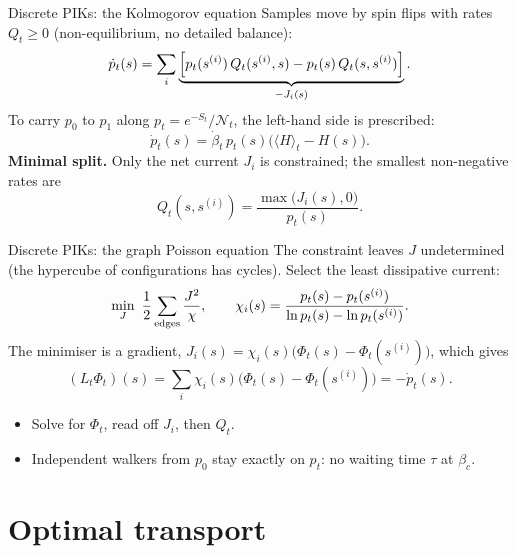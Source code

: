 \documentclass[aspectratio=169]{beamer}
\def\b{\begin{equation}}
\def\e{\end{equation}}
\begin{document}
\begin{frame}{Discrete PIKs: the Kolmogorov equation}
  Samples move by spin flips with rates $Q_t\ge0$ (non-equilibrium, no detailed balance):
  \b
    \dot p_t(s) = \sum_{i}\underbrace{\Bigl[p_t(s^{(i)})\,Q_t(s^{(i)},s) - p_t(s)\,Q_t(s,s^{(i)})\Bigr]}_{-J_i(s)} .
  \e
  To carry $p_0$ to $p_1$ along $p_t=e^{-S_t}/\mathcal N_t$, the left-hand side is prescribed:
  \b
    \dot p_t(s) = \dot\beta_t\, p_t(s)\bigl(\langle H\rangle_t - H(s)\bigr) .
  \e
  \textbf{Minimal split.} Only the net current $J_i$ is constrained; the smallest non-negative
  rates are
  \b
    Q_t(s,s^{(i)}) = \frac{\max\bigl(J_i(s),0\bigr)}{p_t(s)} .
  \e
\end{frame}

\begin{frame}{Discrete PIKs: the graph Poisson equation}
  The constraint leaves $J$ undetermined (the hypercube of configurations has cycles).
  Select the least dissipative current:
  \b
    \min_J\ \frac12\sum_{\rm edges}\frac{J^2}{\chi},
    \qquad \chi_i(s) = \frac{p_t(s)-p_t(s^{(i)})}{\ln p_t(s)-\ln p_t(s^{(i)})} .
  \e
  The minimiser is a gradient, $J_i(s)=\chi_i(s)\bigl(\Phi_t(s)-\Phi_t(s^{(i)})\bigr)$, which gives
  \b
    (L_t\Phi_t)(s) = \sum_i \chi_i(s)\bigl(\Phi_t(s)-\Phi_t(s^{(i)})\bigr) = -\dot p_t(s) .
  \e
  \begin{itemize}
    \item Solve for $\Phi_t$, read off $J_i$, then $Q_t$.
    \item Independent walkers from $p_0$ stay exactly on $p_t$: no waiting time $\tau$ at $\beta_c$.
  \end{itemize}
\end{frame}

\section{Optimal transport}
\end{document}
